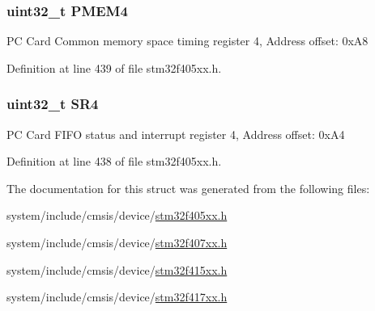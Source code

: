 \subsubsection[{\texorpdfstring{P\+M\+E\+M4}{PMEM4}}]{ uint32\+\_\+t P\+M\+E\+M4}\hypertarget{struct_f_s_m_c___bank4___type_def_a3f82cc749845fb0dd7dfa8121d96b663}{}\label{struct_f_s_m_c___bank4___type_def_a3f82cc749845fb0dd7dfa8121d96b663}
PC Card Common memory space timing register 4, Address offset\+: 0x\+A8 

Definition at line 439 of file stm32f405xx.\+h.

\subsubsection[{\texorpdfstring{S\+R4}{SR4}}]{ uint32\+\_\+t S\+R4}\hypertarget{struct_f_s_m_c___bank4___type_def_a8218d6e11dae5d4468c69303dec0b4fc}{}\label{struct_f_s_m_c___bank4___type_def_a8218d6e11dae5d4468c69303dec0b4fc}
PC Card F\+I\+FO status and interrupt register 4, Address offset\+: 0x\+A4 

Definition at line 438 of file stm32f405xx.\+h.



The documentation for this struct was generated from the following files\+:\begin{DoxyCompactItemize}
\item 
system/include/cmsis/device/\hyperlink{stm32f405xx_8h}{stm32f405xx.\+h}\item 
system/include/cmsis/device/\hyperlink{stm32f407xx_8h}{stm32f407xx.\+h}\item 
system/include/cmsis/device/\hyperlink{stm32f415xx_8h}{stm32f415xx.\+h}\item 
system/include/cmsis/device/\hyperlink{stm32f417xx_8h}{stm32f417xx.\+h}\end{DoxyCompactItemize}
